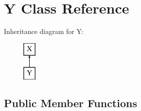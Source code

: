 \section{Y Class Reference}
\label{classY}
Inheritance diagram for Y\+:\begin{figure}[H]
\begin{center}
\leavevmode
\includegraphics[height=2.000000cm]{classY}
\end{center}
\end{figure}
\subsection*{Public Member Functions}
